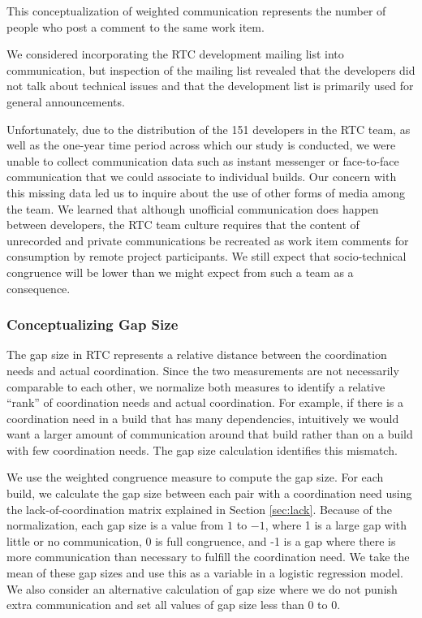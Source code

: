 This conceptualization of weighted communication represents the number of people who post a comment to the same work item.

We considered incorporating the RTC development mailing list into communication, but inspection of the mailing list revealed that the developers did not talk about technical issues and that the development list is primarily used for general announcements.

Unfortunately, due to the distribution of the 151 developers in the RTC team, as well as the one-year time period across which our study is conducted, we were unable to collect communication data such as instant messenger or face-to-face communication that we could associate to individual builds. Our concern with this missing data led us to inquire about the use of other forms of media among the team. We learned that although unofficial communication does happen between developers, the RTC team culture requires that the content of unrecorded and private communications be recreated as work item comments for consumption by remote project participants. We still expect that socio-technical congruence will be lower than we might expect from such a team as a consequence.

\subsubsection{Conceptualizing Gap Size}

The gap size in RTC represents a relative distance between the coordination needs and actual coordination. Since the two measurements are not necessarily comparable to each other, we normalize both measures to identify a relative ``rank'' of coordination needs and actual coordination. For example, if there is a coordination need in a build that has many dependencies, intuitively we would want a larger amount of communication around that build rather than on a build with few coordination needs. The gap size calculation identifies this mismatch.

We use the weighted congruence measure to compute the gap size. For each build, we calculate the gap size between each pair with a coordination need using the lack-of-coordination matrix explained in Section \ref{sec:lack}. Because of the normalization, each gap size is a value from $1$ to $-1$, where 1 is a large gap with little or no communication, 0 is full congruence, and -1 is a gap where there is more communication than necessary to fulfill the coordination need. We take the mean of these gap sizes and use this as a variable in a logistic regression model. We also consider an alternative calculation of gap size where we do not punish extra communication and set all values of gap size less than 0 to 0.

